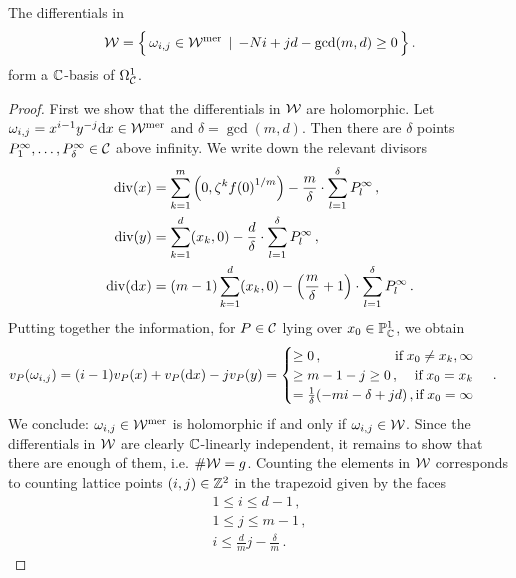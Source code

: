 \documentclass[main.tex]{subfiles}
\begin{document}
     \begin{prop}\label{prop:SEDFF}
	The differentials in
	\begin{align*}
	  \mathcal{W} =  \Big\{ \, \omega_{i,j} \in \mathcal{W}^{\text{mer}} \, \mid \, -Ni + jd - \gcd(m,d) \ge 0 \, \Big\}\,.
	\end{align*}
	form  a $\mathbb{C}$-basis of $\Omega^1_{\mathcal{C}}$.
     \end{prop}
     \begin{proof}
      First we show that the differentials in $\mathcal{W}$ are holomorphic.
      Let $\omega_{i,j} = x^{i-1}y^{-j} \mathrm d x \in \mathcal{W}^{\text{mer}}$ and $\delta = \gcd(m,d)$. Then there are $\delta$ points  $P^{\infty}_1,\dots,P^{\infty}_{\delta} \in \mathcal{C}$ above infinity. We write down the relevant divisors
      \begin{align*}
       \operatorname{div}(x) & = \sum_{k=1}^m \left(0,\zeta^k{f(0)}^{1/m}\right) - \frac{m}{\delta} \cdot \sum_{l = 1}^{\delta} P^{\infty}_l\,, \\
       \operatorname{div}(y) & = \sum_{k = 1}^d (x_k,0) - \frac{d}{\delta} \cdot \sum_{l = 1}^{\delta}  P^{\infty}_l\,, \\
       \operatorname{div}(\mathrm d x) & = (m-1)\sum_{k = 1}^d (x_k,0) - \left(\frac{m}{\delta} + 1\right)\cdot \sum_{l = 1}^{\delta}  P^{\infty}_l\,.
      \end{align*}
     Putting together the information, for $P \in \mathcal{C}$ lying over $x_0 \in \mathbb{P}^1_{\mathbb{C}}$, we obtain
     \begin{align}\label{eq:diff_cases}
      v_P(\omega_{i,j}) & = (i-1) v_P(x) + v_P(\dx)  - j v_P(y) = 
	\begin{cases}
	 \ge 0\,, \hfill \text{if} \; x_0 \ne x_k,\infty \\
	 \ge m-1-j \ge 0 \,, \hfill \text{if} \; x_0 = x_k \\
	 = \frac{1}{\delta}(-mi-\delta+jd)\,,\hfill \text{if} \; x_0 = \infty
	\end{cases}\,.
     \end{align}
     We conclude: $\omega_{i,j} \in \mathcal{W}^{\text{mer}}$ is holomorphic if and only if $\omega_{i,j} \in \mathcal{W}$. \abstand
     Since the differentials in $\mathcal{W}$ are clearly $\mathbb{C}$-linearly independent, it remains to show that
     there are enough of them, i.e. $\#\mathcal{W} = g$. \abstand
     Counting the elements in $\mathcal{W}$ corresponds to counting lattice points $(i,j) \in \mathbb{Z}^2$ in the trapezoid given by the faces
     \begin{align*}
	1 \le i \le d-1\,,\\
	1 \le j \le m-1\,, \\
	i \le \frac{d}{m}j - \frac{\delta}{m}\,.
     \end{align*}

\end{proof}
\end{document}
